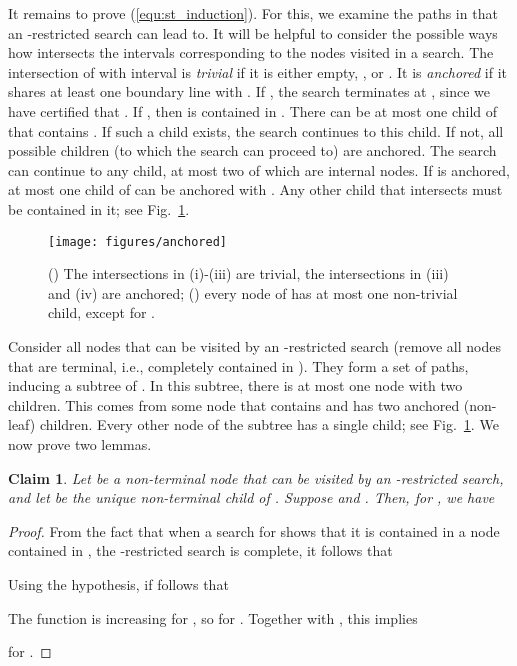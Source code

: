 \documentclass[letterpaper,11pt]{article}
\newtheorem{claim}[theorem]{Claim}
\begin{document}
It remains to prove 
(\ref{equ:st_induction}).
For this, we examine the 
paths in  that an 
-restricted search can lead to.
It will be helpful to consider 
the possible ways how   
intersects the intervals 
corresponding to the nodes 
visited in a search. The 
intersection  of 
 with interval  is 
\emph{trivial} if it is 
either empty, , or . 
It is \emph{anchored} if it 
shares at least one boundary 
line with .  If 
, the search 
terminates at , since 
we have certified that . 
If , 
then  is contained in .
There can be at most one child of 
 that contains . If such a 
child exists, the search continues 
to this child. If not, all 
possible children (to which the search can proceed to) 
are anchored. The search
can continue to any child, at most two 
of which are internal nodes.
If  is anchored,  at most one child 
of  can be anchored with .
Any other child that intersects  must 
be contained in it; see
Fig.~\ref{fig:anchored}.

\begin{figure}
\centering
\texttt{[image: figures/anchored]}
\caption{() The 
intersections  in (i)-(iii) 
are trivial, the
intersections in (iii) and (iv) 
are anchored; () every 
node of 
has at most one non-trivial child, 
except for .}
\label{fig:anchored}
\end{figure}


Consider all nodes that 
can be visited by an -restricted 
search (remove all nodes that are 
terminal, i.e., completely 
contained in ).  They form a 
set of paths, inducing a subtree 
of . In this subtree, there 
is at most one node with two children. 
This comes from some node  
that contains  and has two 
anchored (non-leaf) children. Every 
other node of the subtree has a 
single child; see Fig.~\ref{fig:anchored}.
We now prove two lemmas.

\begin{claim}\label{clm:WA}
  Let  be a 
  non-terminal node that 
  can be visited by 
  an -restricted
  search, and let  
  be the unique non-terminal 
  child of . Suppose 
  and .
  Then, for , we have
  
\end{claim}

\begin{proof}
From the fact that when a 
search for  shows that 
it is contained in a node 
contained in , the 
-restricted search 
is complete, it follows that

Using the hypothesis, if follows that 

The function  
is increasing for , 
so  
for  .
Together with , 
this implies

for .
\end{proof}
\end{document}
